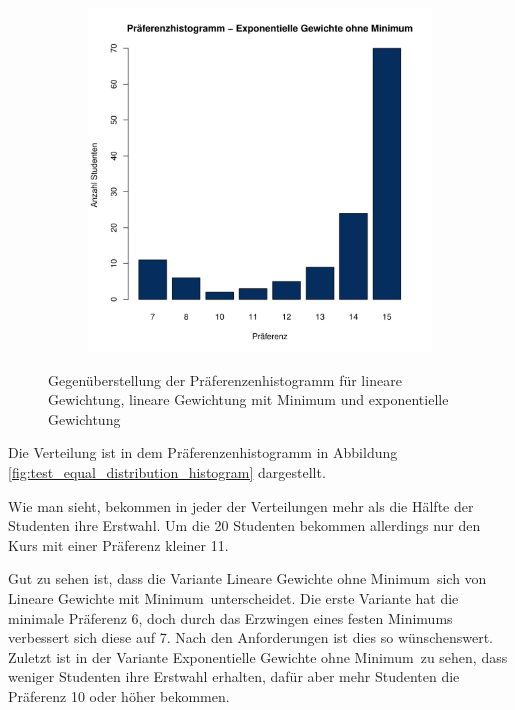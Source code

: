 \begin{figure}
\begin{subfigure}{0.30\textwidth}
				\end{subfigure}
			\begin{subfigure}{0.3\textwidth}
				\includegraphics[width=1.0\textwidth]{./testing/images/NormalDistPreferencesHistExpo.jpg}
			\end{subfigure}
				\caption{Gegenüberstellung der Präferenzenhistogramm für lineare Gewichtung, lineare Gewichtung mit Minimum und exponentielle Gewichtung}
				\label{fig:test_norm_distribution_histogram}
			\end{figure}
		
			Die Verteilung ist in dem Präferenzenhistogramm in Abbildung \ref{fig:test_equal_distribution_histogram} dargestellt.\newline
			
			Wie man sieht, bekommen in jeder der Verteilungen mehr als die Hälfte der Studenten ihre Erstwahl.
			Um die 20 Studenten bekommen allerdings nur den Kurs mit einer Präferenz kleiner 11.\newline
			
			Gut zu sehen ist, dass die Variante \glqq Lineare Gewichte ohne Minimum\grqq~sich von \glqq Lineare Gewichte mit Minimum\grqq~unterscheidet.
			Die erste Variante hat die minimale Präferenz 6, doch durch das Erzwingen eines festen Minimums verbessert sich diese auf 7.
			Nach den Anforderungen ist dies so wünschenswert.
			Zuletzt ist in der Variante \glqq Exponentielle Gewichte ohne Minimum\grqq~zu sehen, dass weniger Studenten ihre Erstwahl erhalten, dafür aber mehr Studenten die Präferenz 10 oder höher bekommen.\newline
			
